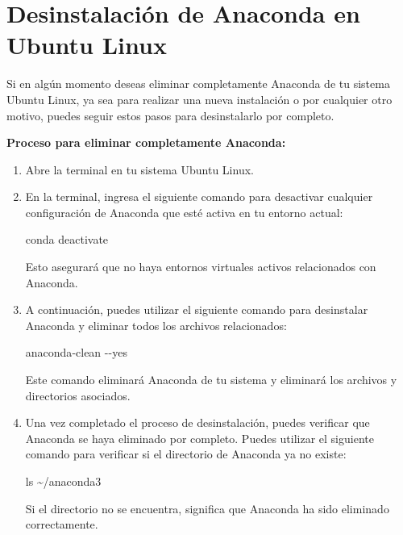 \documentclass[
  jou,
  floatsintext,
  longtable,
  a4paper,
  nolmodern,
  notxfonts,
  notimes,
  colorlinks=true,linkcolor=blue,citecolor=blue,urlcolor=blue]{apa7}
\newenvironment{Shaded}{\begin{snugshade}}{\end{snugshade}}
\newcommand{\AttributeTok}[1]{\textcolor[rgb]{0.40,0.45,0.13}{#1}}
\newcommand{\ExtensionTok}[1]{\textcolor[rgb]{0.00,0.23,0.31}{#1}}
\newcommand{\FunctionTok}[1]{\textcolor[rgb]{0.28,0.35,0.67}{#1}}
\newcommand{\NormalTok}[1]{\textcolor[rgb]{0.00,0.23,0.31}{#1}}
\begin{document}
\section{Desinstalación de Anaconda en Ubuntu
Linux}\label{desinstalaciuxf3n-de-anaconda-en-ubuntu-linux}

Si en algún momento deseas eliminar completamente Anaconda de tu sistema
Ubuntu Linux, ya sea para realizar una nueva instalación o por cualquier
otro motivo, puedes seguir estos pasos para desinstalarlo por completo.

\textbf{Proceso para eliminar completamente Anaconda:}

\begin{enumerate}
\def\labelenumi{\arabic{enumi}.}
\item
  Abre la terminal en tu sistema Ubuntu Linux.
\item
  En la terminal, ingresa el siguiente comando para desactivar cualquier
  configuración de Anaconda que esté activa en tu entorno actual:

\begin{Shaded}
\begin{Highlighting}[]
\ExtensionTok{conda}\NormalTok{ deactivate}
\end{Highlighting}
\end{Shaded}

  Esto asegurará que no haya entornos virtuales activos relacionados con
  Anaconda.
\item
  A continuación, puedes utilizar el siguiente comando para desinstalar
  Anaconda y eliminar todos los archivos relacionados:

\begin{Shaded}
\begin{Highlighting}[]
\ExtensionTok{anaconda{-}clean} \AttributeTok{{-}{-}yes}
\end{Highlighting}
\end{Shaded}

  Este comando eliminará Anaconda de tu sistema y eliminará los archivos
  y directorios asociados.
\item
  Una vez completado el proceso de desinstalación, puedes verificar que
  Anaconda se haya eliminado por completo. Puedes utilizar el siguiente
  comando para verificar si el directorio de Anaconda ya no existe:

\begin{Shaded}
\begin{Highlighting}[]
\FunctionTok{ls}\NormalTok{ \textasciitilde{}/anaconda3}
\end{Highlighting}
\end{Shaded}

  Si el directorio no se encuentra, significa que Anaconda ha sido
  eliminado correctamente.
\end{enumerate}
\end{document}
